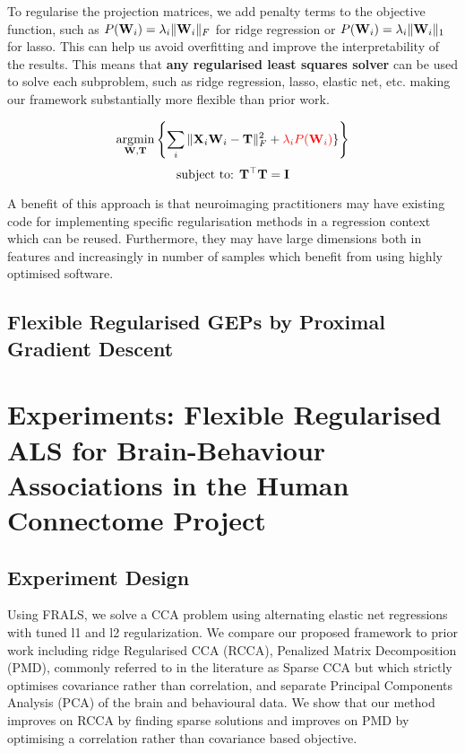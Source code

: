 To regularise the projection matrices, we add penalty terms to the objective function, such as $P(\bold{W}_i)=\lambda_i\|\bold{W}_i\|_F$ for ridge regression or $P(\bold{W}_i)=\lambda_i\|\bold{W}_i\|_1$ for lasso. This can help us avoid overfitting and improve the interpretability of the results. This means that \textbf{any regularised least squares solver} can be used to solve each subproblem, such as ridge regression, lasso, elastic net, etc. making our framework substantially more flexible than prior work.

\[ \underset{\bold{W},\bold{T}}{\mathrm{argmin}}\left\{\sum_i \|\bold{X}_i\bold{W}_i-\bold{T}\|_{F}^2 + \textcolor{red}{\lambda_i P(\bold{W}_i)}\}\right\} \]
  \[ \text{subject to: } \bold{T^{\top}T}=\bold{I} \]

A benefit of this approach is that neuroimaging practitioners may have existing code for implementing specific regularisation methods in a regression context which can be reused. Furthermore, they may have large dimensions both in features and increasingly in number of samples which benefit from using highly optimised software. 

\subsection{Flexible Regularised GEPs by Proximal Gradient Descent}

\section{Experiments: Flexible Regularised ALS for Brain-Behaviour Associations in the Human Connectome Project}

\subsection{Experiment Design}

Using FRALS, we solve a CCA problem using alternating elastic net regressions with tuned l1 and l2 regularization. We compare our proposed framework to prior work including ridge Regularised CCA (RCCA), Penalized Matrix Decomposition (PMD), commonly referred to in the literature as Sparse CCA but which strictly optimises covariance rather than correlation, and separate Principal Components Analysis (PCA) of the brain and behavioural data. We show that our method improves on RCCA by finding sparse solutions and improves on PMD by optimising a correlation rather than covariance based objective.

